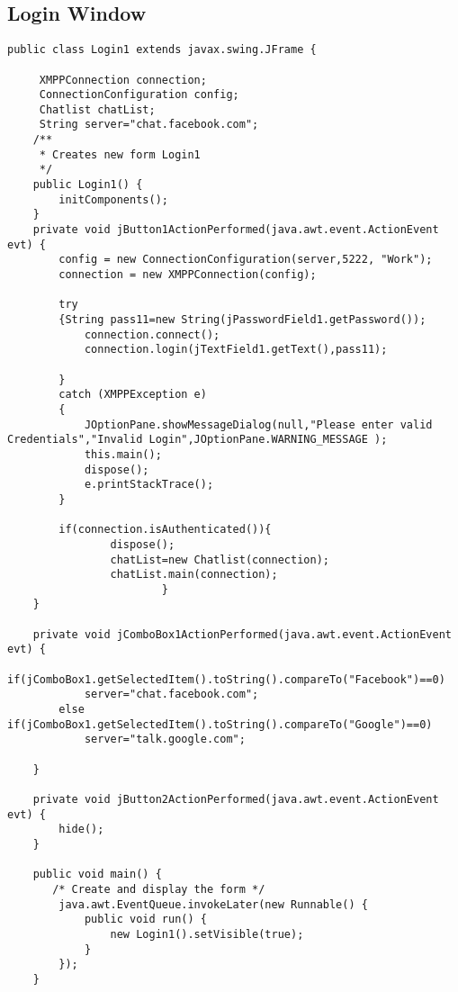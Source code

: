 \documentclass{SureshLimkar}
\begin{document}
\subsection{Login Window}
\begin{lstlisting}
public class Login1 extends javax.swing.JFrame {

     XMPPConnection connection;
     ConnectionConfiguration config;
     Chatlist chatList;
     String server="chat.facebook.com";
    /**
     * Creates new form Login1
     */
    public Login1() {
        initComponents();
    }
    private void jButton1ActionPerformed(java.awt.event.ActionEvent evt) {
        config = new ConnectionConfiguration(server,5222, "Work");
        connection = new XMPPConnection(config);

        try
        {String pass11=new String(jPasswordField1.getPassword());
            connection.connect();
            connection.login(jTextField1.getText(),pass11);

        }
        catch (XMPPException e)
        {
            JOptionPane.showMessageDialog(null,"Please enter valid Credentials","Invalid Login",JOptionPane.WARNING_MESSAGE );
            this.main();
            dispose();
            e.printStackTrace();
        }

        if(connection.isAuthenticated()){
                dispose();
			    chatList=new Chatlist(connection);
			    chatList.main(connection);
                        }
    }
    
    private void jComboBox1ActionPerformed(java.awt.event.ActionEvent evt) {
        if(jComboBox1.getSelectedItem().toString().compareTo("Facebook")==0)
            server="chat.facebook.com";
        else if(jComboBox1.getSelectedItem().toString().compareTo("Google")==0)
            server="talk.google.com";
        
    }

    private void jButton2ActionPerformed(java.awt.event.ActionEvent evt) {
        hide();
    }

    public void main() {
       /* Create and display the form */
        java.awt.EventQueue.invokeLater(new Runnable() {
            public void run() {
                new Login1().setVisible(true);
            }
        });
    }
\end{lstlisting}

\newpage
\end{document}
